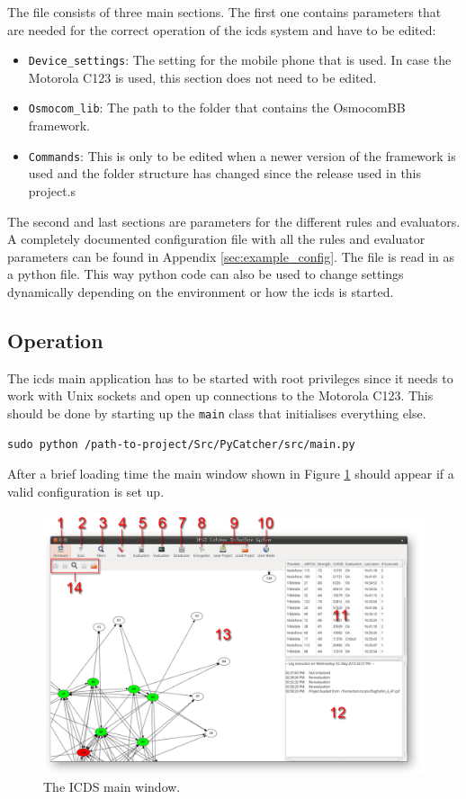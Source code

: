 The file consists of three main sections.
The first one contains parameters that are needed for the correct operation of the \gls{icds} system and have to be edited:
\begin{itemize}
	\item \texttt{Device\_settings}: The setting for the mobile phone that is used.
	In case the Motorola C123 is used, this section does not need to be edited.
	\item \texttt{Osmocom\_lib}: The path to the folder that contains the OsmocomBB framework.
	\item \texttt{Commands}: This is only to be edited when a newer version of the framework is used and the folder structure has changed since the release used in this project.s
\end{itemize}
The second and last sections are parameters for the different rules and evaluators.
A completely documented configuration file with all the rules and evaluator parameters can be found in Appendix \ref{sec:example_config}.
The file is read in as a python file.
This way python code can also be used to change settings dynamically depending on the environment or how the \gls{icds} is started.

\subsection{Operation}
\label{sec:icds_operation}
The \gls{icds} main application has to be started with root privileges since it needs to work with Unix sockets and open up connections to the Motorola C123.
This should be done by starting up the \texttt{main} class that initialises everything else.
\begin{lstlisting}
sudo python /path-to-project/Src/PyCatcher/src/main.py
\end{lstlisting}
After a brief loading time the main window shown in Figure \ref{fig:icds} should appear if a valid configuration is set up.

\begin{figure}
\centering
\includegraphics[width=\textwidth]{../Images/ICDS}
\caption{The ICDS main window.}
\label{fig:icds}
\end{figure}

